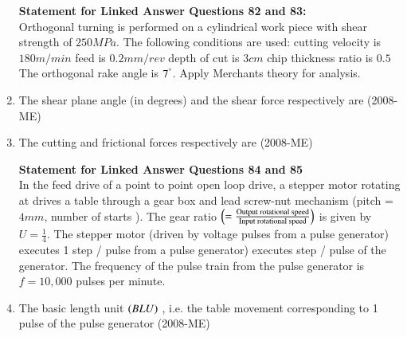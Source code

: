 \documentclass[journal]{IEEEtran}
\begin{document}
\begin{enumerate}
 \textbf{Statement for Linked Answer Questions 82 and 83:} \\
 Orthogonal turning is performed on a cylindrical work piece with shear strength of $250MPa.$
 The following conditions are used: cutting velocity is $180m/min$
 feed is $0.2mm/rev$
 depth of cut is $3cm$
 chip thickness ratio is $0.5$
 The orthogonal rake angle is $7^\degree$.
 Apply Merchants theory for analysis. \\
 \item The shear plane angle (in degrees) and the shear force respectively are \hfill (2008-ME)
 \begin{enumerate}
 \end{enumerate}
 \item The cutting and frictional forces respectively are \hfill (2008-ME)
\begin{enumerate}
\end{enumerate}
\textbf{Statement for Linked Answer Questions 84 and 85} \\
In the feed drive of a point to point open loop 
 drive, a stepper motor rotating at 
 drives a table through a gear box and lead screw-nut mechanism (pitch = $4mm$, number of starts 
). The gear ratio $\left(= \frac{\text{Output rotational speed}}{\text{Input rotational speed}}\right)$ is given by $U = \frac{1}{4}$.
 The stepper motor (driven by voltage pulses from a pulse generator) executes 1
 step / pulse from a pulse generator) executes 
 step / pulse of the generator. The frequency of the pulse train from the pulse generator is $f = 10,000$ pulses per minute. \\
 
 \item The basic length unit $\left(BLU\right)$
, i.e. the table movement corresponding to 1
 pulse of the pulse generator \hfill (2008-ME)

\end{enumerate}
\end{document}
